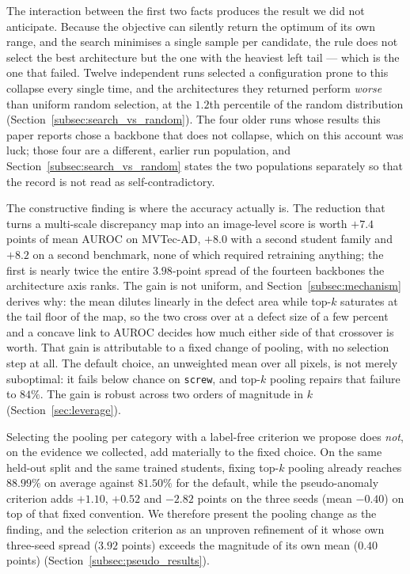 The interaction between the first two facts produces the result we did not
anticipate. Because the objective can silently return the optimum of its own
range, and the search minimises a single sample per candidate, the rule does not
select the best architecture but the one with the heaviest left tail --- which is
the one that failed. Twelve independent runs selected a configuration prone to
this collapse every single time, and the architectures they returned perform
\emph{worse} than uniform random selection, at the $1.2$th percentile of the
random distribution (Section~\ref{subsec:search_vs_random}). The four older runs
whose results this paper reports chose a backbone that does not
collapse, which on this account was luck; those four are a different, earlier run
population, and Section~\ref{subsec:search_vs_random} states the two populations
separately so that the record is not read as self-contradictory.

The constructive finding is where the accuracy actually is. The reduction that
turns a multi-scale discrepancy map into an image-level score is worth $+7.4$
points of mean AUROC on MVTec-AD, $+8.0$ with a second student family and $+8.2$ on
a second benchmark, none of which required retraining anything; the first is nearly twice the entire $3.98$-point spread of
the fourteen backbones the architecture axis ranks. The gain is not uniform, and
Section~\ref{subsec:mechanism} derives why: the mean dilutes linearly in the
defect area while top-$k$ saturates at the tail floor of the map, so the two cross
over at a defect size of a few percent and a concave link to AUROC decides how
much either side of that crossover is worth. That gain is attributable to a fixed change of pooling, with no
selection step at all. The default choice, an unweighted mean over all pixels, is
not merely suboptimal: it fails below chance on \texttt{screw}, and top-$k$
pooling repairs that failure to $84\%$. The gain is robust across two orders of
magnitude in $k$ (Section~\ref{sec:leverage}).

Selecting the pooling per category with a label-free criterion we propose does
\emph{not}, on the evidence we collected, add materially to the fixed choice. On
the same held-out split and the same trained students, fixing top-$k$ pooling
already reaches $88.99\%$ on average against $81.50\%$ for the default, while the
pseudo-anomaly criterion adds $+1.10$, $+0.52$ and $-2.82$ points on the three
seeds (mean $-0.40$) on top of that fixed convention. We therefore present the
pooling change as the finding, and the selection criterion as
an unproven refinement of it whose own three-seed spread ($3.92$ points) exceeds
the magnitude of its own mean ($0.40$ points)
(Section~\ref{subsec:pseudo_results}).

